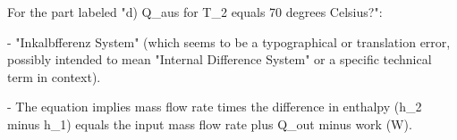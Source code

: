For the part labeled "d) Q_aus for T_2 equals 70 degrees Celsius?":

- "Inkalbfferenz System" (which seems to be a typographical or translation error, possibly intended to mean "Internal Difference System" or a specific technical term in context).
  
- The equation implies mass flow rate times the difference in enthalpy (h_2 minus h_1) equals the input mass flow rate plus Q_out minus work (W).
